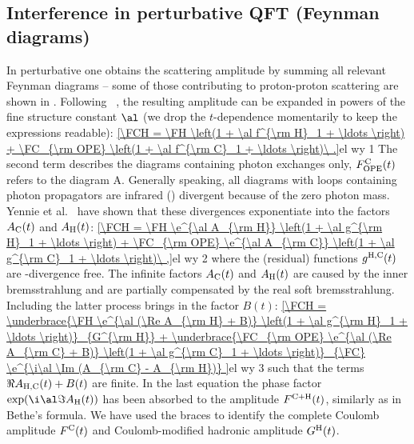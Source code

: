 \subsection[int qft]{Interference in perturbative QFT (Feynman diagrams)}

\baselineskip
{}


In perturbative  one obtains the scattering amplitude by summing all relevant Feynman diagrams -- some of those contributing to proton-proton scattering are shown in . Following \WaY\ , the resulting amplitude can be expanded in powers of the fine structure constant $\al$ (we drop the $t$-dependence momentarily to keep the expressions readable):
\eqref{\FCH = \FH \left(1 + \al f^{\rm H}_1 + \ldots \right) + \FC_{\rm OPE} \left(1 + \al f^{\rm C}_1 + \ldots \right)\ .}{el wy 1}
The second term describes the diagrams containing photon exchanges only, $F^{\rm C}_{\rm OPE}(t)$ refers to the diagram  A. Generally speaking, all diagrams with loops containing photon propagators are infrared () divergent because of the zero photon mass. Yennie et al.\  have shown that these divergences exponentiate into the factors $A_{\rm C}(t)$ and $A_{\rm H}(t)$:
\eqref{\FCH = \FH \e^{\al A_{\rm H}} \left(1 + \al g^{\rm H}_1 + \ldots \right) + \FC_{\rm OPE} \e^{\al A_{\rm C}} \left(1 + \al g^{\rm C}_1 + \ldots \right)\ ,}{el wy 2}
where the (residual) functions $g^{\rm H, C}(t)$ are -divergence free. The infinite factors $A_{\rm C}(t)$ and $A_{\rm H}(t)$ are caused by the inner bremsstrahlung and are partially compensated by the real soft bremsstrahlung. Including the latter process brings in the factor $B(t)$:
\eqref{\FCH =
\underbrace{\FH \e^{\al (\Re A_{\rm H} + B)} \left(1 + \al g^{\rm H}_1 + \ldots \right)}_{G^{\rm H}}
+
\underbrace{\FC_{\rm OPE} \e^{\al (\Re A_{\rm C} + B)} \left(1 + \al g^{\rm C}_1 + \ldots \right)}_{\FC}
\e^{\i\al \Im (A_{\rm C} - A_{\rm H})}
}{el wy 3}
such that the terms $\Re A_{\rm H, C}(t) + B(t)$ are finite. In the last equation the phase factor $\exp(\i\al \Im A_{\rm H}(t))$ has been absorbed to the amplitude $F^{\rm C+H}(t)$, similarly as in Bethe's formula. We have used the braces to identify the complete Coulomb amplitude $F^{\rm C}(t)$ and Coulomb-modified hadronic amplitude $G^{\rm H}(t)$.


